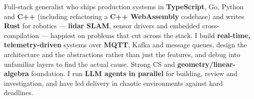 
\begin{cvparagraph}
Full-stack generalist who ships production systems in \textbf{TypeScript}, Go, Python and \textbf{C++} (including refactoring a \textbf{C++ WebAssembly} codebase) and writes \textbf{Rust} for robotics --- \textbf{lidar SLAM}, sensor drivers and embedded cross-compilation --- happiest on problems that cut across the stack. I build \textbf{real-time, telemetry-driven} systems over \textbf{MQTT}, Kafka and message queues, design the architecture and the abstractions rather than just the features, and debug into unfamiliar layers to find the actual cause. Strong CS and \textbf{geometry/linear-algebra} foundation. I run \textbf{LLM agents in parallel} for building, review and investigation, and have led delivery in chaotic environments against hard deadlines.
\end{cvparagraph}
